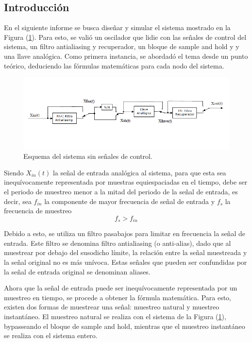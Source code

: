 



\subsection{Introducción}

En el siguiente informe se busca diseñar y simular el sistema mostrado en la Figura (\ref{fig:sist}). Para esto, se valió un oscilador que lidie con las señales de control del sistema, un filtro antialiasing y recuperador, un bloque de sample and hold y y una llave analógica. Como primera instancia, se abordadó el tema desde un punto teórico, deduciendo las fórmulas matemáticas para cada nodo del sistema.
\begin{figure}[H]
	\centering
	\includegraphics[width=\textwidth]{ImagenesEjercicio1/sistema.png}
\caption{Esquema del sistema sin señales de control.}
	\label{fig:sist}
\end{figure}

Siendo $X_{in}(t)$ la señal de entrada analógica al sistema, para que esta sea inequívocamente representada por muestras equiespaciadas en el tiempo, debe ser el periodo de muestreo menor a la mitad del periodo de la señal de entrada, es decir, sea $f_{in}$ la componente de mayor frecuencia de señal de entrada y $f_s$ la frecuencia de muestreo
\begin{equation}
f_{s} > f_{in}
\end{equation}

Debido a esto, se utiliza un filtro pasabajos para limitar en frecuencia la señal de entrada. Este filtro se denomina filtro antialiasing (o anti-alias), dado que al muestrear por debajo del susodicho límite, la relación entre la señal muestreada y la señal original no es más unívoca. Estas señales que pueden ser confundidas por la señal de entrada original se denominan aliases.

Ahora que la señal de entrada puede ser inequívocamente representada por un muestreo en tiempo, se procede a obtener la fórmula matemática. Para esto, existen dos formas de muestrear una señal: muestreo natural y muestreo instantáneo. El muestreo natural se realiza con el sistema de la Figura (\ref{fig:sist}), bypasseando el bloque de sample and hold, mientras que el muestreo instantáneo se realiza con el sistema entero.


